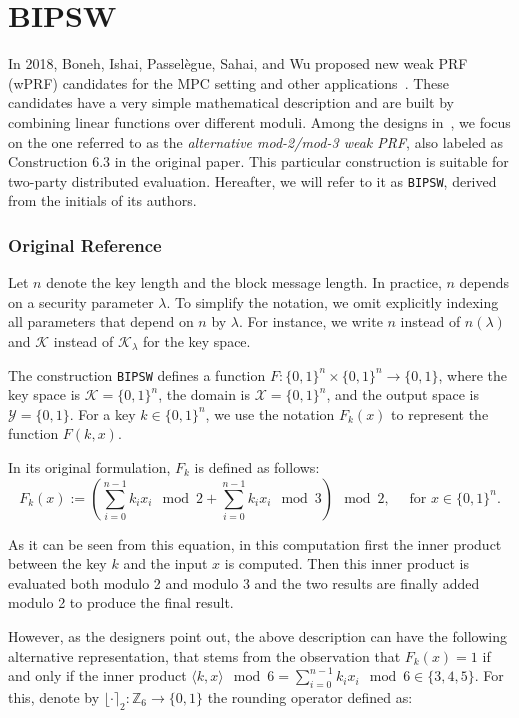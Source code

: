 \section{BIPSW}
\label{sec:ealpn}

In 2018, Boneh, Ishai, Passelègue, Sahai, and Wu proposed new weak PRF (wPRF) candidates for the MPC setting and other applications~\cite{TCC:BIPSW18}. These candidates have a very simple mathematical description and are built by combining  linear functions over different moduli. Among the designs in~\cite{TCC:BIPSW18}, we focus on the one referred to as the \emph{alternative mod-2/mod-3 weak PRF}, also labeled as Construction 6.3 in the original paper. This particular construction is  suitable for two-party distributed evaluation. Hereafter, we will refer to it as {\tt BIPSW}, derived from the initials of its authors.

\subsubsection*{Original Reference}

Let $n$ denote the key length and the block message length. In practice, $n$ depends on a security parameter $\lambda$. To simplify the notation, we omit explicitly indexing all parameters that depend on $n$ by $\lambda$. For instance, we write $n$ instead of $n(\lambda)$ and $\mathcal{K}$ instead of $\mathcal{K}_{\lambda}$ for the key space.

The construction {\tt BIPSW} defines a function $F : \{0,1\}^n \times \{0,1\}^n \to \{0,1\}$, where the key space is $\mathcal{K} = \{0,1\}^n$, the domain is $\mathcal{X} = \{0,1\}^n$, and the output space is $\mathcal{Y} = \{0,1\}$. For a key $k \in \{0,1\}^n$, we use the notation $F_k(x)$ to represent the function $F(k, x)$.

In its original formulation, $F_k$ is defined as follows:
    \begin{equation} \label{eq:bipsw_orig}
    F_k(x) := \left(\sum_{i = 0}^{n-1} k_i x_i \mod 2 + \sum_{i = 0}^{n-1} k_i x_i \mod 3\right) \mod{2}, \quad \text{ for } x \in \{0,1\}^n.  
    \end{equation}


As it can be seen from this equation, in this computation first the inner product between the key $k$ and the input $x$ is computed. Then this inner product is evaluated both modulo 2 and modulo 3 and the two results are finally added modulo 2 to produce the final result.  

However, as the designers point out, the above description can have the following alternative representation, that stems from the observation that $F_k(x) = 1$ if and only if the inner product $\langle k, x \rangle  \mod{6} = \sum_{i = 0}^{n-1} k_i x_i \mod{6} \in \{3,4,5\}$. For this, denote by $\lfloor \cdot \rceil_2 : \mathbb{Z}_6 \rightarrow \{0,1\}$ the rounding operator defined as:

